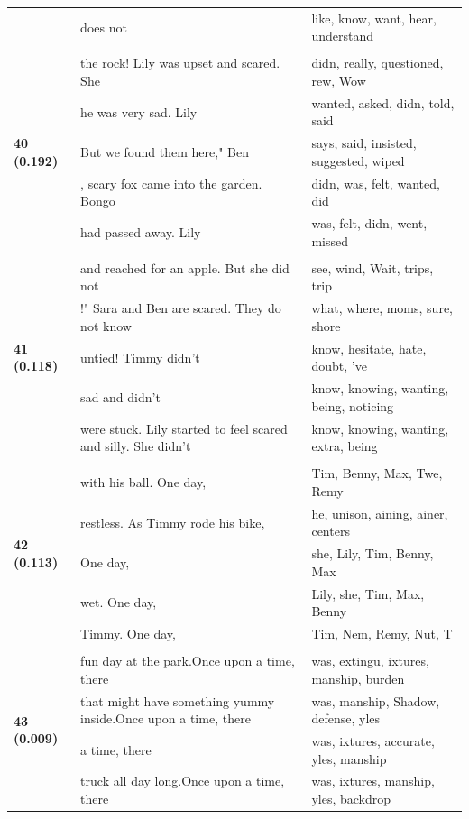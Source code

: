 \documentclass{article}
\theoremstyle{plain}
\theoremstyle{definition}
\theoremstyle{remark}
\begin{document}
\begin{longtable}{|p{}|p{}|p{}|}
& does not & like,  know,  want,  hear,  understand \\
& & \\
\multirow{5}{*}{\textbf{40 (0.192)}} & the rock! Lily was upset and scared. She & didn,  really,  questioned, rew, Wow \\
& he was very sad. Lily & wanted,  asked,  didn,  told,  said \\
& But we found them here," Ben & says,  said,  insisted,  suggested,  wiped \\
& , scary fox came into the garden. Bongo & didn,  was,  felt,  wanted,  did \\
& had passed away. Lily & was,  felt,  didn,  went,  missed \\
& & \\
\multirow{5}{*}{\textbf{41 (0.118)}} & and reached for an apple.  But she did not & see,  wind, Wait,  trips,  trip \\
& !"  Sara and Ben are scared. They do not know & what,  where,  moms,  sure,  shore \\
& untied! Timmy didn't & know,  hesitate,  hate,  doubt, 've \\
& sad and didn't & know,  knowing,  wanting,  being,  noticing \\
& were stuck. Lily started to feel scared and silly. She didn't & know,  knowing,  wanting,  extra,  being \\
& & \\
\multirow{5}{*}{\textbf{42 (0.113)}} & with his ball. One day, & Tim,  Benny,  Max,  Twe,  Remy \\
& restless.   As Timmy rode his bike, & he,  unison, aining, ainer,  centers \\
& One day, & she,  Lily,  Tim,  Benny,  Max \\
& wet. One day, & Lily,  she,  Tim,  Max,  Benny \\
& Timmy. One day, & Tim,  Nem,  Remy,  Nut,  T \\
& & \\
\multirow{5}{*}{\textbf{43 (0.009)}} & fun day at the park.Once upon a time, there & was,  extingu, ixtures, manship,  burden \\
& that might have something yummy inside.Once upon a time, there & was, manship, Shadow,  defense, yles \\
& a time, there & was, ixtures,  accurate, yles, manship \\
& truck all day long.Once upon a time, there & was, ixtures, manship, yles,  backdrop \\

\end{longtable}
\end{document}
